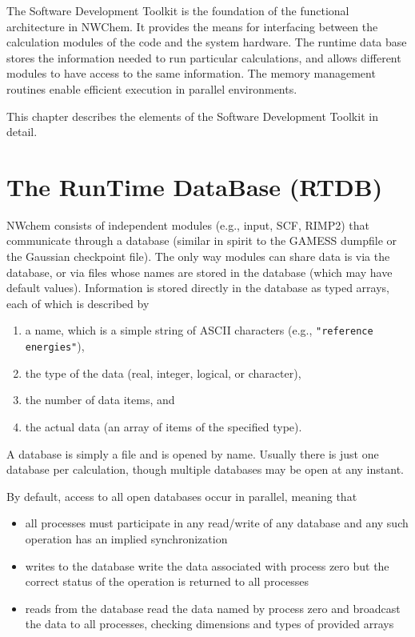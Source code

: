 \label{sec:sdt}

The Software Development Toolkit is the foundation of the functional architecture
in NWChem.  It provides the means for interfacing between the calculation modules
of the code and the system hardware.  The runtime data base 
stores the information needed to run particular calculations, and allows 
different modules to have access to the same information.  The memory 
management routines enable efficient execution in parallel environments.

This chapter describes the elements of the Software Development Toolkit
in detail.

\section{The RunTime DataBase (RTDB)}

\label{sec:rtdb}

NWchem consists of independent modules (e.g., input, SCF, RIMP2) that
communicate through a database (similar in spirit to the GAMESS
dumpfile or the Gaussian checkpoint file).  The only way modules can
share data is via the database, or via files whose names are stored in
the database (which may have default values).  Information is stored
directly in the database as typed arrays, each of which is described by
\begin{enumerate}
\item a name, which is a simple string of ASCII characters (e.g., 
      \verb+"reference energies"+),
\item the type of the data (real, integer, logical, or character), 
\item the number of data items, and
\item the actual data (an array of items of the specified type).
\end{enumerate}

A database is simply a file and is opened by name. Usually there is
just one database per calculation, though multiple databases may be
open at any instant.  

By default, access to all open databases occur in parallel, meaning
that
\begin{itemize}
\item all processes must participate in any read/write of any database
  and any such operation has an implied synchronization
\item writes to the database write the data associated with process
  zero but the correct status of the operation is returned to all
  processes
\item reads from the database read the data named by process zero and
  broadcast the data to all processes, checking dimensions and types
  of provided arrays
\end{itemize}

